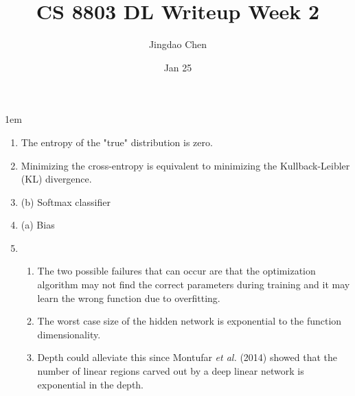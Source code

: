 \documentclass[twoside,12pt]{article}
\begin{document}
\title{CS 8803 DL Writeup Week 2}
\author{Jingdao Chen}
\date{Jan 25}
\maketitle
\openup 1em

\begin{enumerate}
	\item The entropy of the "true" distribution is zero.
	\item Minimizing the cross-entropy is equivalent to minimizing the Kullback-Leibler (KL) divergence.
	\item (b) Softmax classifier
	\item (a) Bias
	\item \begin{enumerate}
		\item The two possible failures that can occur are that the optimization algorithm may not find the correct parameters during training and
				it may learn the wrong function due to overfitting.
		\item The worst case size of the hidden network is exponential to the function dimensionality.
		\item Depth could alleviate this since Montufar \textit{ et al.} (2014) showed that the number of linear regions carved out by a deep linear
				network is exponential in the depth.
		\end{enumerate}
\end{enumerate}
\end{document}
